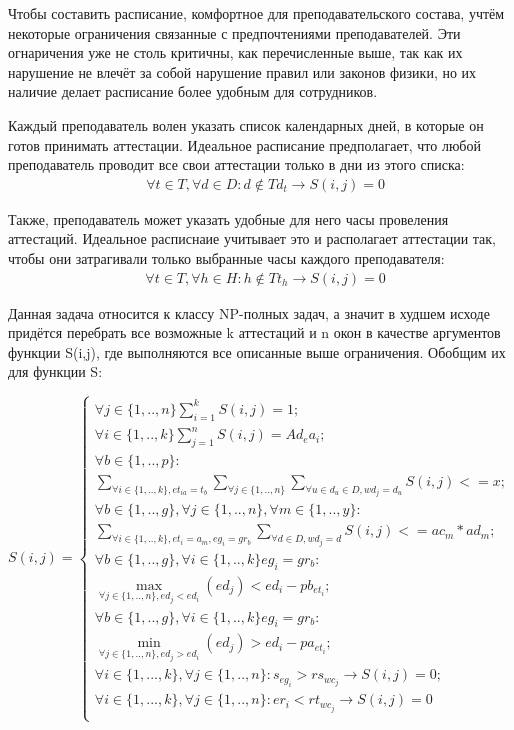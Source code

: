 Чтобы составить расписание, комфортное для преподавательского состава, учтём некоторые ограничения связанные с предпочтениями преподавателей. Эти огнаричения уже не столь критичны, как перечисленные выше, так как их нарушение не влечёт за собой нарушение правил или законов физики, но их наличие делает расписание более удобным для сотрудников.

Каждый преподаватель волен указать список календарных дней, в которые он готов принимать аттестации. Идеальное расписание предполагает, что любой преподаватель проводит все свои аттестации только в дни из этого списка:
\begin{align}
	\label{eq:T1}
	& \forall t \in T, \forall d \in D : d \notin Td_t \rightarrow S(i,j) = 0
\end{align}

Также, преподаватель может указать удобные для него часы провеления аттестаций. Идеальное расписнаие учитывает это и располагает аттестации так, чтобы они затрагивали только выбранные часы каждого преподавателя:
\begin{align}
	\label{eq:T2}
	& \forall t \in T, \forall h \in H : h \notin Tt_h \rightarrow S(i,j) = 0
\end{align}

Данная задача относится к классу NP-полных задач, а значит в худшем исходе придётся перебрать все возможные k аттестаций и n окон в качестве аргументов функции S(i,j), где выполняются все описанные выше ограничения. Обобщим их для функции S:

\begin{equation}
	\label{eq:S}
	S(i,j) = 
	\begin{cases}
		\forall  j \in \{1,..,n\} \sum_{i=1}^kS(i,j) = 1;\\
		\forall  i \in \{1,..,k\} \sum_{j=1}^nS(i,j) = Ad_ea_i;\\
		\forall b \in \{1,..,p\} : \\ \sum_{\forall i \in \{1,..,k\}, et_{ia}=t_b}\sum_{\forall j \in \{1,..,n\}}\sum_{ \forall u \in d_u \in D, wd_j = d_u }S(i,j) <= x;\\
		\forall b \in \{1,..,g\}, \forall j \in \{1,..,n\}, \forall m \in \{1,..,y\} :
		\\ \sum_{\forall i \in \{1,..,k\}, et_i = a_m,  eg_i=gr_b}\sum_{ \forall d \in D, wd_j = d }S(i,j) <= ac_m * ad_m;\\
		\forall b \in \{1,..,g\}, \forall i \in \{1,..,k\} eg_i=gr_b: \\ \max\limits_{\forall j \in \{1,..,n\}, ed_j < ed_i}(ed_j) <ed_i-pb_{et_i};\\
	\forall b \in \{1,..,g\}, \forall i \in \{1,..,k\} eg_i=gr_b:\\ \min\limits_{\forall j \in \{1,..,n\}, ed_j > ed_i}(ed_j) >ed_i-pa_{et_i};\\
	\forall i \in \{1,...,k\}, \forall j \in \{1,..,n\} : s_{eg_i} > rs_{wc_j} \rightarrow S(i,j) = 0;\\
	\forall i \in \{1,...,k\}, \forall j \in \{1,..,n\} : er_i < rt_{wc_j} \rightarrow S(i,j) = 0\\
	\end{cases}
\end{equation}

